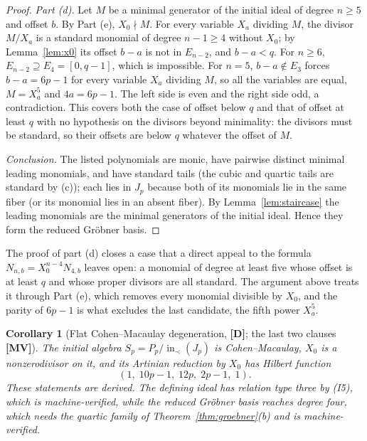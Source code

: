 \documentclass[11pt]{article}
\newtheorem{corollary}[theorem]{Corollary}
\theoremstyle{definition}
\theoremstyle{remark}
\newcommand{\mD}{\textbf{[D]}}
\newcommand{\mMV}{\textbf{[MV]}}
\begin{document}
\begin{proof}
\emph{Part (d).} Let $M$ be a minimal generator of the initial ideal of degree $n\geq5$ and offset
$b$. By Part (e), $X_0\nmid M$. For every variable $X_a$ dividing $M$, the divisor $M/X_a$ is
a standard monomial of degree $n-1\geq4$ without $X_0$; by Lemma~\ref{lem:x0} its offset
$b-a$ is not in $E_{n-2}$, and $b-a<q$. For $n\geq6$, $E_{n-2}\supseteq E_4=[0,q-1]$, which is
impossible. For $n=5$, $b-a\notin E_3$ forces $b-a=6p-1$ for every variable $X_a$ dividing $M$,
so all the variables are equal, $M=X_a^5$ and $4a=6p-1$. The left side is even and the right
side odd, a contradiction. This covers both the case of offset below $q$ and that of offset at
least $q$ with no hypothesis on the divisors beyond minimality: the divisors must be standard,
so their offsets are below $q$ whatever the offset of $M$.

\emph{Conclusion.} The listed polynomials are monic, have pairwise distinct minimal leading
monomials, and have standard tails (the cubic and quartic tails are standard by (c)); each lies in $J_p$ because both
of its monomials lie in the same fiber (or its monomial lies in an absent fiber). By
Lemma~\ref{lem:staircase} the leading monomials are the minimal generators of the initial ideal.
Hence they form the reduced Gr\"obner basis.
\end{proof}

The proof of part (d) closes a case that a direct appeal to the formula $N_{n,b}=X_0^{n-4}N_{4,b}$
leaves open: a monomial of degree at least five whose offset is at least $q$ and whose proper
divisors are all standard. The argument above treats it through Part (e), which removes every
monomial divisible by $X_0$, and the parity of $6p-1$ is what excludes the last candidate, the
fifth power $X_a^5$.

\begin{corollary}[Flat Cohen--Macaulay degeneration, \mD; the last two clauses \mMV]\label{cor:degeneration}
The initial algebra $S_p=P_p/\operatorname{in}_\prec(J_p)$ is Cohen--Macaulay, $X_0$ is a nonzerodivisor
on it, and its Artinian reduction by $X_0$ has Hilbert function
\[
 (1,\;10p-1,\;12p,\;2p-1,\;1).
\]
These statements are derived. The defining ideal has relation type three by (I5), which is
machine-verified, while the reduced Gr\"obner basis reaches degree four, which needs the quartic
family of Theorem~\ref{thm:groebner}(b) and is machine-verified.
\end{corollary}
\end{document}
